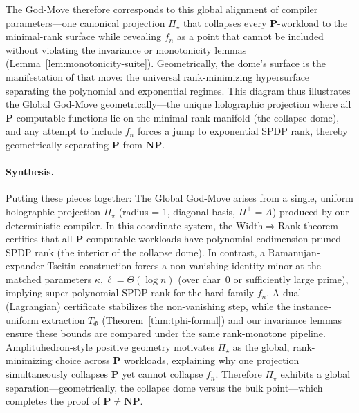 \documentclass[12pt]{article}
\theoremstyle{definition}
\theoremstyle{definition}
\theoremstyle{remark}
\theoremstyle{remark}
\begin{document}
The God-Move therefore corresponds to this global alignment of compiler parameters---one canonical projection $\Pi_\star$ that collapses every $\mathbf{P}$-workload to the minimal-rank surface while revealing $f_n$ as a point that cannot be included without violating the invariance or monotonicity lemmas (Lemma~\ref{lem:monotonicity-suite}). Geometrically, the dome's surface is the manifestation of that move: the universal rank-minimizing hypersurface separating the polynomial and exponential regimes. This diagram thus illustrates the Global God-Move geometrically---the unique holographic projection where all $\mathbf{P}$-computable functions lie on the minimal-rank manifold (the collapse dome), and any attempt to include $f_n$ forces a jump to exponential SPDP rank, thereby geometrically separating $\mathbf{P}$ from $\mathbf{NP}$.

\paragraph{Synthesis.}
Putting these pieces together: The Global God-Move arises from a single, uniform holographic projection $\Pi_\star$ (radius = 1, diagonal basis, $\Pi^+ = A$) produced by our deterministic compiler. In this coordinate system, the Width$\Rightarrow$Rank theorem certifies that all $\mathbf{P}$-computable workloads have polynomial codimension-pruned SPDP rank (the interior of the collapse dome). In contrast, a Ramanujan-expander Tseitin construction forces a non-vanishing identity minor at the matched parameters $\kappa,\ell = \Theta(\log n)$ (over char~0 or sufficiently large prime), implying super-polynomial SPDP rank for the hard family $f_n$. A dual (Lagrangian) certificate stabilizes the non-vanishing step, while the instance-uniform extraction $T_\Phi$ (Theorem~\ref{thm:tphi-formal}) and our invariance lemmas ensure these bounds are compared under the same rank-monotone pipeline. Amplituhedron-style positive geometry motivates $\Pi_\star$ as the global, rank-minimizing choice across $\mathbf{P}$ workloads, explaining why one projection simultaneously collapses $\mathbf{P}$ yet cannot collapse $f_n$. Therefore $\Pi_\star$ exhibits a global separation---geometrically, the collapse dome versus the bulk point---which completes the proof of $\mathbf{P} \neq \mathbf{NP}$.
\end{document}
